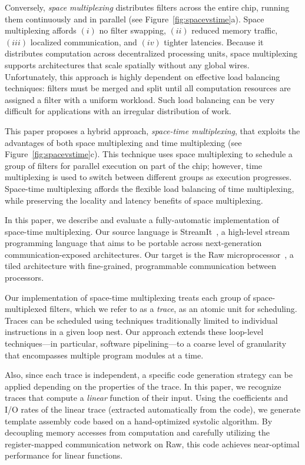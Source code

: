 Conversely, {\it space multiplexing} distributes filters across the
entire chip, running them continuously and in parallel (see
Figure~\ref{fig:spacevstime}a).  Space multiplexing affords $(i)$ no
filter swapping, $(ii)$ reduced memory traffic, $(iii)$ localized
communication, and $(iv)$ tighter latencies.  Because it distributes
computation across decentralized processing units, space multiplexing
supports architectures that scale spatially without any global wires.
Unfortunately, this approach is highly dependent on effective load
balancing techniques: filters must be merged and split until all
computation resources are assigned a filter with a uniform workload.
Such load balancing can be very difficult for applications with an
irregular distribution of work.

This paper proposes a hybrid approach, {\it space-time multiplexing},
that exploits the advantages of both space multiplexing and time
multiplexing (see Figure~\ref{fig:spacevstime}c).  This technique uses
space multiplexing to schedule a group of filters for parallel
execution on part of the chip; however, time multiplexing is used to
switch between different groups as execution progresses.  Space-time
multiplexing affords the flexible load balancing of time multiplexing,
while preserving the locality and latency benefits of space
multiplexing.

In this paper, we describe and evaluate a fully-automatic
implementation of space-time multiplexing.  Our source language is
StreamIt~\cite{streamitcc}, a high-level stream programming language
that aims to be portable across next-generation communication-exposed
architectures.  Our target is the Raw
microprocessor~\cite{raw10,raw_isca}, a tiled architecture with
fine-grained, programmable communication between processors.  

Our implementation of space-time multiplexing treats each group of
space-multiplexed filters, which we refer to as a {\it trace}, as an
atomic unit for scheduling.  Traces can be scheduled using techniques
traditionally limited to individual instructions in a given loop nest.
Our approach extends these loop-level techniques---in particular,
software pipelining---to a coarse level of granularity that
encompasses multiple program modules at a time.

Also, since each trace is independent, a specific code generation
strategy can be applied depending on the properties of the trace.  In
this paper, we recognize traces that compute a {\it linear} function
of their input.  Using the coefficients and I/O rates of the linear
trace (extracted automatically from the code), we generate template
assembly code based on a hand-optimized systolic algorithm.  By
decoupling memory accesses from computation and carefully utilizing
the register-mapped communication network on Raw, this code achieves
near-optimal performance for linear functions.


